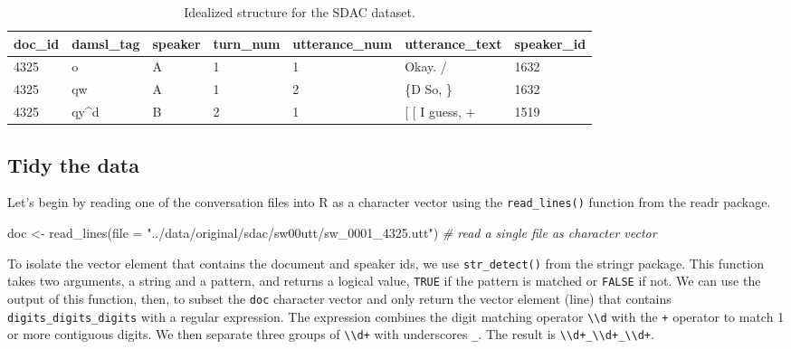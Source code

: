 \documentclass[
  letterpaper,
]{latex/krantz}
\newenvironment{Shaded}{\begin{snugshade}}{\end{snugshade}}
\newcommand{\AttributeTok}[1]{\textcolor[rgb]{0.00,0.00,0.00}{#1}}
\newcommand{\CommentTok}[1]{\textcolor[rgb]{0.00,0.00,0.00}{\textit{#1}}}
\newcommand{\FunctionTok}[1]{\textcolor[rgb]{0.00,0.00,0.00}{#1}}
\newcommand{\NormalTok}[1]{\textcolor[rgb]{0.00,0.00,0.00}{#1}}
\newcommand{\OtherTok}[1]{\textcolor[rgb]{0.00,0.00,0.00}{#1}}
\newcommand{\StringTok}[1]{\textcolor[rgb]{0.00,0.00,0.00}{#1}}
\begin{document}
\hypertarget{tbl-cd-semi-sdac-idealized-dataset}{}
\begin{table}
\caption{\label{tbl-cd-semi-sdac-idealized-dataset}Idealized structure for the SDAC dataset. }\tabularnewline

\centering
\begin{tabular}{lllllll}
\toprule
doc\_id & damsl\_tag & speaker & turn\_num & utterance\_num & utterance\_text & speaker\_id\\
\midrule
4325 & o & A & 1 & 1 & Okay.  / & 1632\\
4325 & qw & A & 1 & 2 & \{D So, \} & 1632\\
4325 & qy\textasciicircum{}d & B & 2 & 1 & {}[ [ I guess, + & 1519\\
\bottomrule
\end{tabular}
\end{table}

\hypertarget{tidy-the-data-1}{%
\subsection{Tidy the data}\label{tidy-the-data-1}}

Let's begin by reading one of the conversation files into R as a
character vector using the \texttt{read\_lines()} function from the
readr package.

\begin{Shaded}
\begin{Highlighting}[]
\NormalTok{doc }\OtherTok{\textless{}{-}} 
  \FunctionTok{read\_lines}\NormalTok{(}\AttributeTok{file =} \StringTok{"../data/original/sdac/sw00utt/sw\_0001\_4325.utt"}\NormalTok{) }\CommentTok{\# read a single file as character vector}
\end{Highlighting}
\end{Shaded}

To isolate the vector element that contains the document and speaker
ids, we use \texttt{str\_detect()} from the stringr package. This
function takes two arguments, a string and a pattern, and returns a
logical value, \texttt{TRUE} if the pattern is matched or \texttt{FALSE}
if not. We can use the output of this function, then, to subset the
\texttt{doc} character vector and only return the vector element (line)
that contains \texttt{digits\_digits\_digits} with a regular expression.
The expression combines the digit matching operator
\texttt{\textbackslash{}\textbackslash{}d} with the \texttt{+} operator
to match 1 or more contiguous digits. We then separate three groups of
\texttt{\textbackslash{}\textbackslash{}d+} with underscores
\texttt{\_}. The result is
\texttt{\textbackslash{}\textbackslash{}d+\_\textbackslash{}\textbackslash{}d+\_\textbackslash{}\textbackslash{}d+}.
\end{document}
